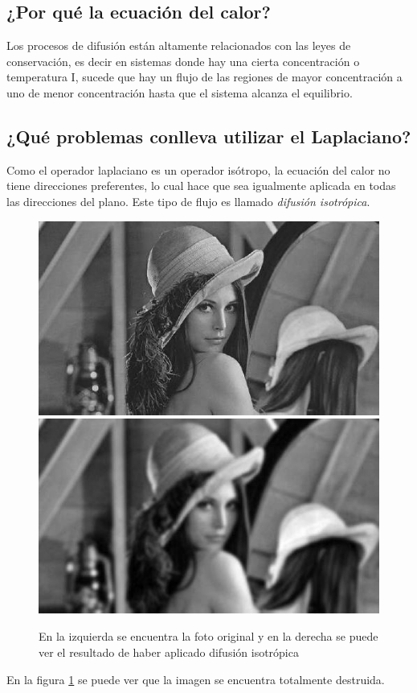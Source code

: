 \documentclass[conference]{IEEEtran}
\begin{document}
\subsection{¿Por qué la ecuación del calor?}
Los procesos de difusión están altamente relacionados con las leyes de conservación, es decir en sistemas donde hay una cierta concentración o temperatura I, sucede que hay un flujo de las regiones de mayor concentración a uno de menor concentración hasta que el sistema alcanza el equilibrio.
\subsection{¿Qué problemas conlleva utilizar el Laplaciano?}
Como el operador laplaciano es un operador isótropo, la ecuación del calor no tiene direcciones preferentes, lo cual hace que sea igualmente aplicada en todas las direcciones del plano. Este tipo de flujo es llamado  \textit{difusión isotrópica}.

\begin{figure}[H]
\begin{centering}
\includegraphics[scale=0.5]{original.JPG}
\includegraphics[scale=0.5]{confiltro.JPG}
\par\end{centering}
\caption{En la izquierda se encuentra la foto original y en la derecha se puede ver el resultado de haber aplicado difusión isotrópica}
\label{fig:ComparacionDifIso}
\end{figure}
En la figura \ref{fig:ComparacionDifIso} se puede ver que la imagen se encuentra totalmente destruida.
\end{document}
